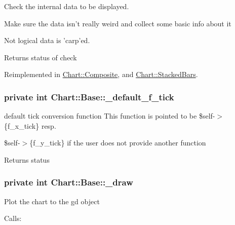 Check the internal data to be displayed. 

Make sure the data isn't really weird and collect some basic info about it\par
 Not logical data is 'carp'ed.\par
 \begin{DoxyReturn}{Returns}
status of check 
\end{DoxyReturn}


Reimplemented in \hyperlink{classChart_1_1Composite_a67af0ad77d0c1f4f74da434ceb9cf53c}{Chart::Composite}, and \hyperlink{classChart_1_1StackedBars_a8d772463780f75cc985ae890ad8a94d1}{Chart::StackedBars}.

\hypertarget{classChart_1_1Base_a060d522a2f0240cad4c746891d488f80}{
\subsubsection[{\_\-default\_\-f\_\-tick}]{\setlength{\rightskip}{0pt plus 5cm}private int {\bf Chart::Base::\_\-default\_\-f\_\-tick}}}
\label{classChart_1_1Base_a060d522a2f0240cad4c746891d488f80}


default tick conversion function This function is pointed to be \$self-\/$>$\{f\_\-x\_\-tick\} resp. 

\$self-\/$>$\{f\_\-y\_\-tick\} if the user does not provide another function

\begin{DoxyReturn}{Returns}
status 
\end{DoxyReturn}
\hypertarget{classChart_1_1Base_ab021c0dceb1ae55e1697bbee667480fa}{
\subsubsection[{\_\-draw}]{\setlength{\rightskip}{0pt plus 5cm}private int {\bf Chart::Base::\_\-draw}}}
\label{classChart_1_1Base_ab021c0dceb1ae55e1697bbee667480fa}


Plot the chart to the gd object\par
 Calls: 

